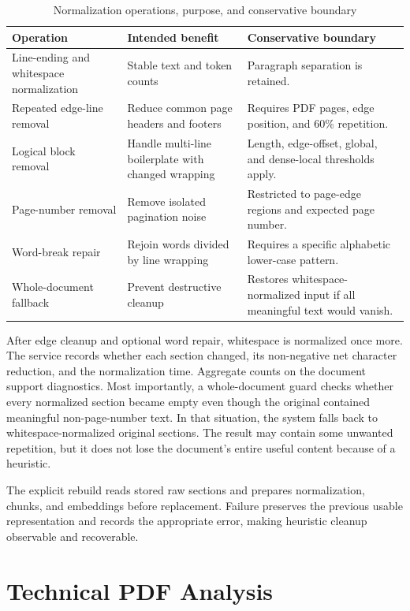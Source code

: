 \begin{table}[!htbp]
	\centering
	\small
	\caption{Normalization operations, purpose, and conservative boundary}
	\label{tab:normalization-operations}
	\begin{tabular}{p{3.2cm}p{4.4cm}p{5.4cm}}
		\toprule
		Operation & Intended benefit & Conservative boundary \\
		\midrule
		Line-ending and whitespace normalization & Stable text and token counts & Paragraph separation is retained. \\
		Repeated edge-line removal & Reduce common page headers and footers & Requires PDF pages, edge position, and 60\% repetition. \\
		Logical block removal & Handle multi-line boilerplate with changed wrapping & Length, edge-offset, global, and dense-local thresholds apply. \\
		Page-number removal & Remove isolated pagination noise & Restricted to page-edge regions and expected page number. \\
		Word-break repair & Rejoin words divided by line wrapping & Requires a specific alphabetic lower-case pattern. \\
		Whole-document fallback & Prevent destructive cleanup & Restores whitespace-normalized input if all meaningful text would vanish. \\
		\bottomrule
	\end{tabular}
\end{table}

After edge cleanup and optional word repair, whitespace is normalized once
more. The service records whether each section changed, its non-negative net
character reduction, and the normalization time. Aggregate counts on the
document support diagnostics. Most importantly, a whole-document guard checks
whether every normalized section became empty even though the original
contained meaningful non-page-number text. In that situation, the system
falls back to whitespace-normalized original sections. The result may contain
some unwanted repetition, but it does not lose the document's entire useful
content because of a heuristic.

The explicit rebuild reads stored raw sections and prepares normalization,
chunks, and embeddings before replacement. Failure preserves the previous
usable representation and records the appropriate error, making heuristic
cleanup observable and recoverable.

\section{Technical PDF Analysis}
\label{sec:technical-pdf-analysis}

